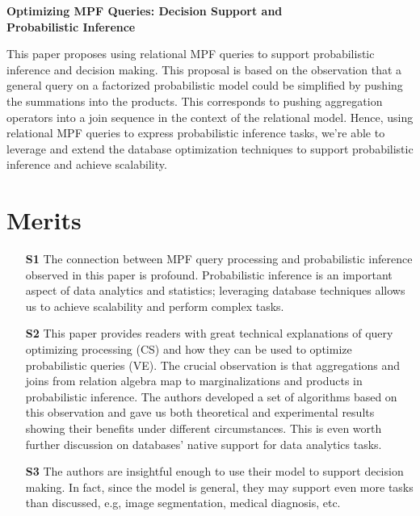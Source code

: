 \documentclass[a4paper]{article}
\begin{document}
\pagestyle{fancy}                                                       %
\lfoot{}                                                      %
\cfoot{}                                                                %
\renewcommand\headrulewidth{0.4pt}                                      %

\renewcommand{\title}[1]{\begin{center}
\Large\textbf{#1}
\end{center}}

\title{Optimizing MPF Queries: Decision Support and\\ Probabilistic Inference}

This paper proposes using relational MPF queries to support probabilistic inference and decision making. This proposal is based on the observation that a general query on a factorized probabilistic model could be simplified by pushing the summations into the products. This corresponds to pushing aggregation operators into a join sequence in the context of the relational model. Hence, using relational MPF queries to express probabilistic inference tasks, we're able to leverage and extend the database optimization techniques to support probabilistic inference and achieve scalability.


\section*{Merits}
\begin{itemize}
\item[\textbf{S1}]
The connection between MPF query processing and probabilistic inference observed in this paper is profound. Probabilistic inference is an important aspect of data analytics and statistics; leveraging database techniques allows us to achieve scalability and perform complex tasks.

\item[\textbf{S2}]
This paper provides readers with great technical explanations of query optimizing processing (CS) and how they can be used to optimize probabilistic queries (VE). The crucial observation is that aggregations and joins from relation algebra map to marginalizations and products in probabilistic inference. The authors developed a set of algorithms based on this observation and gave us both theoretical and experimental results showing their benefits under different circumstances. This is even worth further discussion on databases' native support for data analytics tasks.

\item[\textbf{S3}]
The authors are insightful enough to use their model to support decision making. In fact, since the model is general, they may support even more tasks than discussed, e.g, image segmentation, medical diagnosis, etc.
\end{itemize}
\end{document}
